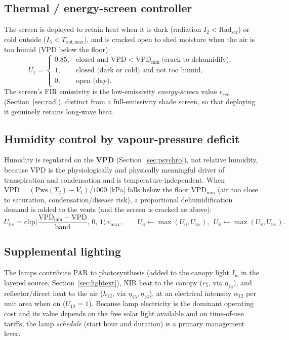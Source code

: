 \documentclass[11pt,a4paper]{article}
\newcommand{\Tair}{T_{2}}
\newcommand{\Vair}{V_{1}}
\begin{document}
\subsection{Thermal / energy-screen controller}
The screen is deployed to retain heat when it is dark (radiation $I_2<\mathrm{Rad}_{\text{scr}}$) or
cold outside ($I_5<T_{\text{out,max}}$), and is cracked open to shed moisture when the air is too
humid (VPD below the floor):
\begin{equation}
  U_1 = \begin{cases}
    0.85, & \text{closed and } \mathrm{VPD}<\mathrm{VPD}_{\min}\ \text{(crack to dehumidify)},\\
    1, & \text{closed (dark or cold) and not too humid},\\
    0, & \text{open (day)}.
  \end{cases}
\end{equation}
The screen's FIR emissivity is the low-emissivity \emph{energy-screen} value $\epsilon_{scr}$
(Section~\ref{sec:rad}), distinct from a full-emissivity shade screen, so that deploying it genuinely
retains long-wave heat.

\subsection{Humidity control by vapour-pressure deficit}
Humidity is regulated on the \textbf{VPD} (Section~\ref{sec:psychro}), not relative humidity, because
VPD is the physiologically and physically meaningful driver of transpiration and condensation and is
temperature-independent. When $\mathrm{VPD}=(\mathrm{Pws}(\Tair)-\Vair)/1000$ [\si{kPa}] falls below
the floor $\mathrm{VPD}_{\min}$ (air too close to saturation, condensation/disease risk), a
proportional dehumidification demand is added to the vents (and the screen is cracked as above):
\begin{equation}
  U_{\text{hv}} = \mathrm{clip}\!\Big(\frac{\mathrm{VPD}_{\min}-\mathrm{VPD}}{\text{band}},\,0,\,1\Big)\,v_{\max},
  \qquad U_6\leftarrow\max(U_6,U_{\text{hv}}),\ \ U_8\leftarrow\max(U_8,U_{\text{hv}}).
\end{equation}

\subsection{Supplemental lighting}
The lamps contribute PAR to photosynthesis (added to the canopy light $I_w$ in the layered source,
Section~\ref{sec:lightext}), NIR heat to the canopy ($r_5$, via $\eta_{14}$), and reflector/direct
heat to the air ($h_{12}$, via $\eta_{15},\eta_{16}$), at an electrical intensity $\alpha_{12}$ per
unit area when on ($U_{12}=1$). Because lamp electricity is the dominant operating cost and its value
depends on the free solar light available and on time-of-use tariffs, the lamp \emph{schedule}
(start hour and duration) is a primary management lever.
\end{document}
